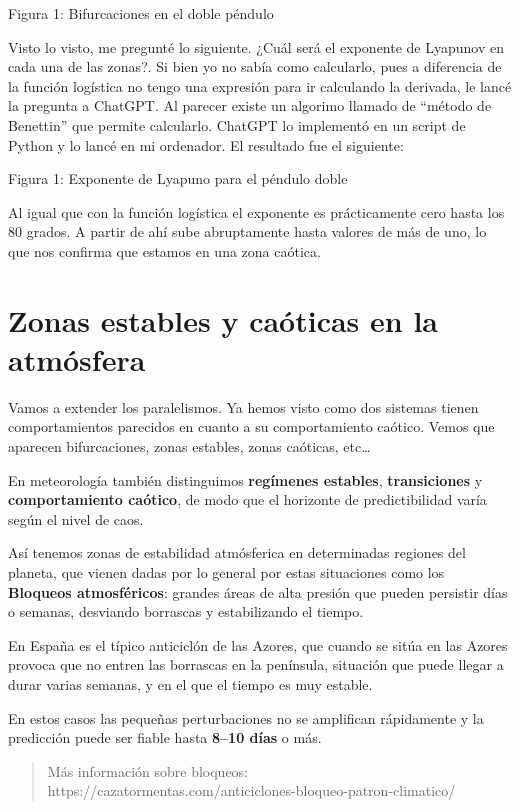 \documentclass[
  10pt,
  a4paper,
  DIV=11,
  numbers=noendperiod,
  open=any]{scrreprt}
\numberwithin{equation}{chapter}
\numberwithin{equation}{chapter}
\renewcommand{\[}{\begin{equation}}
\renewcommand{\]}{\end{equation}}
\begin{document}
Figura 1: Bifurcaciones en el doble péndulo

Visto lo visto, me pregunté lo siguiente. ¿Cuál será el exponente de
Lyapunov en cada una de las zonas?. Si bien yo no sabía como calcularlo,
pues a diferencia de la función logística no tengo una expresión para ir
calculando la derivada, le lancé la pregunta a ChatGPT. Al parecer
existe un algorimo llamado de ``método de Benettin'' que permite
calcularlo. ChatGPT lo implementó en un script de Python y lo lancé en
mi ordenador. El resultado fue el siguiente:

Figura 1: Exponente de Lyapuno para el péndulo doble

Al igual que con la función logística el exponente es prácticamente cero
hasta los 80 grados. A partir de ahí sube abruptamente hasta valores de
más de uno, lo que nos confirma que estamos en una zona caótica.

\section{Zonas estables y caóticas en la
atmósfera}\label{zonas-estables-y-cauxf3ticas-en-la-atmuxf3sfera}

Vamos a extender los paralelismos. Ya hemos visto como dos sistemas
tienen comportamientos parecidos en cuanto a su comportamiento caótico.
Vemos que aparecen bifurcaciones, zonas estables, zonas caóticas,
etc\ldots{}

En meteorología también distinguimos \textbf{regímenes estables},
\textbf{transiciones} y \textbf{comportamiento caótico}, de modo que el
horizonte de predictibilidad varía según el nivel de caos.

Así tenemos zonas de estabilidad atmósferica en determinadas regiones
del planeta, que vienen dadas por lo general por estas situaciones como
los \textbf{Bloqueos atmosféricos}: grandes áreas de alta presión que
pueden persistir días o semanas, desviando borrascas y estabilizando el
tiempo.

En España es el típico anticiclón de las Azores, que cuando se sitúa en
las Azores provoca que no entren las borrascas en la península,
situación que puede llegar a durar varias semanas, y en el que el tiempo
es muy estable.

En estos casos las pequeñas perturbaciones no se amplifican rápidamente
y la predicción puede ser fiable hasta \textbf{8--10 días} o más.

\begin{quote}
Más información sobre bloqueos:\\
https://cazatormentas.com/anticiclones-bloqueo-patron-climatico/
\end{quote}
\end{document}
